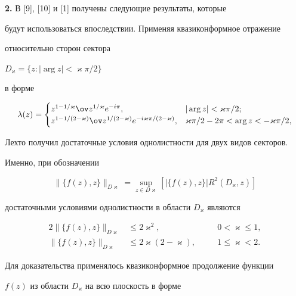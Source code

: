 {\bf 2.} В [9], [10] и [1] получены следующие результаты, которые 


будут использоваться впоследствии. Применяя квазиконформное отражение 


относительно сторон сектора


$D_{\varkappa}=\{z:|\arg z| < \varkappa \pi /2\}$ 


в форме


$$


\lambda(z)=


\begin{cases}


z^{1-1/\varkappa}\ov z{}^{1/\varkappa}e^{- i\pi},


& |\arg z| < \varkappa \pi /2; \\ 


z^{1-1/(2-\varkappa)}\ov z{}^{1/(2-\varkappa)}


e^{-i\varkappa \pi /(2-\varkappa)}, & \varkappa \pi /2- 


2\pi<\arg z<-\varkappa \pi/2, 


\end{cases}


$$


Лехто получил достаточные условия однолистности для двух видов секторов.


Именно, при обозначении


$$ 


\|\{f(z),z\}\|_{D\varkappa}=\sup_{z \in D\varkappa}


[|\{f(z),z\}|R^2(D_{\varkappa},z)]


$$


достаточными условиями однолистности в области $D_\varkappa$ являются


\begin{alignat}{2}


\|\{f(z),z\} \|_{D\varkappa} &\le 2\varkappa^2,&\quad


&0 < \varkappa \le 1,\\


%


\|\{f(z),z\} \|_{D\varkappa} &\le 2\varkappa ({2-\varkappa }),


&\quad &1 \le \varkappa < 2.


\end{alignat}


Для доказательства применялось квазиконформное продолжение функции 


$f(z)$ из области $D_{\varkappa} $ на всю плоскость в форме


